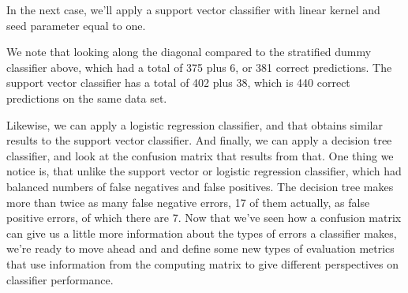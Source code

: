 \begin{multicols}{2}
In the next case, we'll apply a support vector classifier with linear kernel and seed parameter equal to one. 

We note that looking along the diagonal compared to the stratified dummy classifier above, which had a total of 375 plus 6, or 381 correct predictions. The support vector classifier has a total of 402 plus 38, which is 440 correct predictions on the same data set. 

Likewise, we can apply a logistic regression classifier, and that obtains similar results to the support vector classifier. And finally, we can apply a decision tree classifier, and look at the confusion matrix that results from that. One thing we notice is, that unlike the support vector or logistic regression classifier, which had balanced numbers of false negatives and false positives. The decision tree makes more than twice as many false negative errors, 17 of them actually, as false positive errors, of which there are 7. Now that we've seen how a confusion matrix can give us a little more information about the types of errors a classifier makes, we're ready to move ahead and and define some new types of evaluation metrics that use information from the computing matrix to give different perspectives on classifier performance.

\end{multicols}